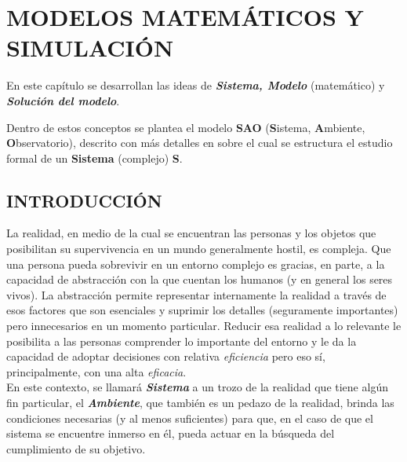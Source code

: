 
\chapter{MODELOS MATEMÁTICOS Y SIMULACIÓN}

\renewcommand{\thefootnote}{\arabic{footnote}}
\renewcommand{\theequation}{\arabic{chapter}-\arabic{equation}}
\renewcommand{\thefigure}{\arabic{chapter}.\arabic{figure}}
\renewcommand{\figurename}{Figura}
\renewcommand{\tablename}{\textbf{Tabla}}
\renewcommand{\thetable}{\textbf{\arabic{chapter}-\arabic{table}}}


\newpage
En este capítulo se desarrollan las ideas de \textit{\textbf{Sistema, Modelo}} (matemático) y \textit{\textbf{Solución del modelo}}.

Dentro de estos conceptos se plantea el modelo \textbf{SAO} (\textbf{S}istema, \textbf{A}mbiente, \textbf{O}bservatorio), descrito con más detalles en \cite{trivino2010complexSystems} sobre el cual se estructura el estudio formal de un \textbf{Sistema} (complejo) \textbf{S}.

\section{INTRODUCCIÓN}\label{sec:intro}
\setcounter{equation}{0}

La realidad, en medio de la cual se encuentran las personas y los objetos que posibilitan su supervivencia en un mundo generalmente hostil, es compleja. Que una persona pueda sobrevivir en un entorno complejo es gracias, en parte, a la capacidad de abstracción con la que cuentan los humanos (y en general los seres vivos). La abstracción permite representar internamente la realidad a través de esos factores que son esenciales y suprimir los detalles (seguramente importantes) pero innecesarios en un momento particular. Reducir esa realidad a lo relevante le posibilita a las personas comprender lo importante del entorno y le da la capacidad de adoptar decisiones con relativa \textit{eficiencia} pero eso sí, principalmente, con una alta \textit{eficacia}.\\

En este contexto, se llamará \textbf{\textit{Sistema}} a un trozo de la realidad que tiene algún fin particular, el \textbf{\textit{Ambiente}}, que también es un pedazo de la realidad, brinda las condiciones necesarias (y al menos suficientes) para que, en el caso de que el sistema se encuentre inmerso en él, pueda actuar en la búsqueda del cumplimiento de su objetivo.\\

